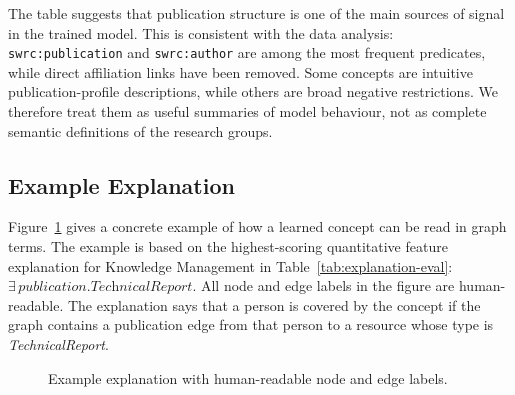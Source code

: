 \documentclass[runningheads]{llncs}
\begin{document}
The table suggests that publication structure is one of the main sources of signal in the trained model.
This is consistent with the data analysis: \texttt{swrc:publication} and \texttt{swrc:author} are among the
most frequent predicates, while direct affiliation links have been removed.  Some concepts are intuitive
publication-profile descriptions, while others are broad negative restrictions.  We therefore treat them as
useful summaries of model behaviour, not as complete semantic definitions of the research groups.

\subsection{Example Explanation}

Figure~\ref{fig:example-explanation} gives a concrete example of how a learned concept can be read in graph
terms.  The example is based on the highest-scoring quantitative feature explanation for Knowledge
Management in Table~\ref{tab:explanation-eval}: $\exists\,\textit{publication}.\textit{TechnicalReport}$.
All node and edge labels in the figure are human-readable.  The explanation says that a person is covered
by the concept if the graph contains a publication edge from that person to a resource whose type is
\textit{TechnicalReport}.

\begin{figure}[ht]
\centering
{}
\caption{Example explanation with human-readable node and edge labels.}
\label{fig:example-explanation}
\end{figure}
\end{document}
